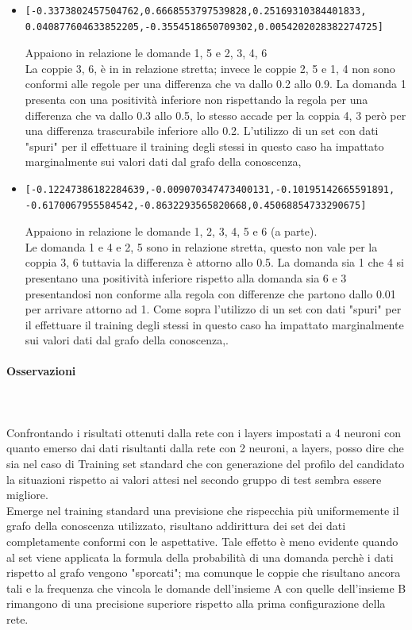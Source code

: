 \begin{itemize}
\item  \begin{verbatim}[-0.3373802457504762,0.6668553797539828,0.25169310384401833,
0.040877604633852205,-0.3554518650709302,0.0054202028382274725]\end{verbatim}
Appaiono in relazione le domande 1, 5 e 2, 3, 4, 6 \\
La coppie 3, 6, \`e in in relazione stretta; invece le coppie 2, 5 e 1, 4 non sono conformi alle regole per una differenza che va dallo 0.2 allo 0.9. La domanda 1 presenta con una positivit\`a inferiore non  rispettando la regola per una differenza che va dallo 0.3 allo 0.5, lo stesso accade per la coppia 4, 3 per\`o per una differenza trascurabile inferiore allo 0.2. L'utilizzo di  un set con dati "spuri" per il effettuare il training degli stessi in questo caso ha impattato marginalmente sui valori dati dal grafo della conoscenza,

\item  \begin{verbatim}[-0.12247386182284639,-0.009070347473400131,-0.10195142665591891,
-0.6170067955584542,-0.8632293565820668,0.45068854733290675]\end{verbatim}
Appaiono in relazione le domande 1, 2, 3, 4, 5  e 6 (a parte).\\
Le domanda 1 e 4 e 2, 5  sono in relazione stretta, questo non vale per la coppia 3, 6 tuttavia la differenza \`e attorno allo 0.5.
La domanda sia 1 che 4 si presentano una positivit\`a inferiore rispetto alla domanda sia 6 e 3 presentandosi non conforme alla regola con differenze che partono dallo 0.01 per arrivare attorno ad 1. Come sopra l'utilizzo di  un set con dati "spuri" per il effettuare il training degli stessi in questo caso ha impattato marginalmente sui valori dati dal grafo della conoscenza,.
\end{itemize}

\paragraph{Osservazioni}\mbox{}
\label{Osservazioni su rete a 2 neuroni}
\\\\
\noindent
Confrontando i risultati ottenuti dalla rete con i layers impostati a 4 neuroni con quanto emerso dai dati risultanti dalla  rete con 2 neuroni, a layers, posso dire che sia nel caso di Training set standard che con generazione del profilo del candidato la situazioni rispetto ai valori attesi nel secondo gruppo di test sembra essere migliore.\\
Emerge nel training standard una previsione che rispecchia pi\`u uniformemente il grafo della conoscenza utilizzato, risultano  addirittura dei set dei dati completamente conformi con le aspettative. Tale effetto \`e meno evidente quando al set viene applicata la formula della probabilit\`a di una domanda perch\`e i dati rispetto al grafo vengono "sporcati"; ma comunque le coppie che risultano ancora tali e la frequenza che vincola le domande dell'insieme A con quelle dell'insieme B rimangono di una precisione superiore rispetto alla prima configurazione della rete.


